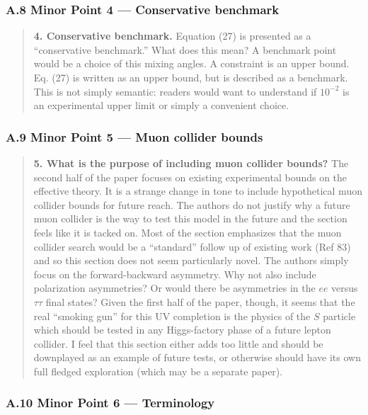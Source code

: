 \documentclass[
]{article}
\begin{document}
\subsubsection{A.8 Minor Point 4 --- Conservative
benchmark}\label{a.8-minor-point-4-conservative-benchmark}

\begin{quote}
\textbf{4. Conservative benchmark.} Equation (27) is presented as a
``conservative benchmark.'' What does this mean? A benchmark point would
be a choice of this mixing angles. A constraint is an upper bound. Eq.
(27) is written as an upper bound, but is described as a benchmark. This
is not simply semantic: readers would want to understand if \(10^{-2}\)
is an experimental upper limit or simply a convenient choice.
\end{quote}

\subsubsection{A.9 Minor Point 5 --- Muon collider
bounds}\label{a.9-minor-point-5-muon-collider-bounds}

\begin{quote}
\textbf{5. What is the purpose of including muon collider bounds?} The
second half of the paper focuses on existing experimental bounds on the
effective theory. It is a strange change in tone to include hypothetical
muon collider bounds for future reach. The authors do not justify why a
future muon collider is the way to test this model in the future and the
section feels like it is tacked on. Most of the section emphasizes that
the muon collider search would be a ``standard'' follow up of existing
work (Ref 83) and so this section does not seem particularly novel. The
authors simply focus on the forward-backward asymmetry. Why not also
include polarization asymmetries? Or would there be asymmetries in the
\(ee\) versus \(\tau\tau\) final states? Given the first half of the
paper, though, it seems that the real ``smoking gun'' for this UV
completion is the physics of the \(S\) particle which should be tested
in any Higgs-factory phase of a future lepton collider. I feel that this
section either adds too little and should be downplayed as an example of
future tests, or otherwise should have its own full fledged exploration
(which may be a separate paper).
\end{quote}

\subsubsection{A.10 Minor Point 6 ---
Terminology}\label{a.10-minor-point-6-terminology}
\end{document}
